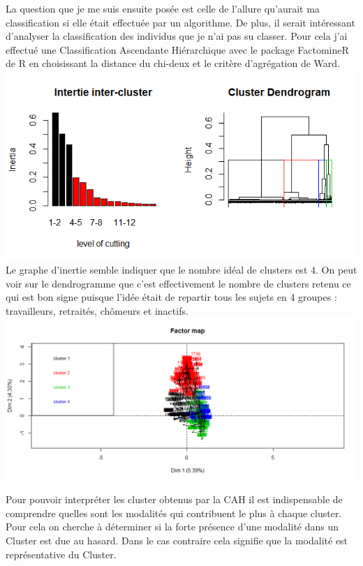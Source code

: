 \documentclass{book}
\begin{document}
\noindent
La question que je me suis ensuite posée est celle de l'allure qu'aurait ma classification si elle était effectuée par un algorithme. De plus, il serait intéressant d'analyser la classification des individus que je n'ai pas su classer.
Pour cela j'ai effectué une Classification Ascendante Hiérarchique avec le package FactomineR de R en choisissant la distance du chi-deux et le critère d'agrégation de Ward.\\

\includegraphics[scale = 1]{dendro_inertie_cah.png}\\
Le graphe d'inertie semble indiquer que le nombre idéal de clusters est 4. On peut voir sur le dendrogramme que c'est effectivement le nombre de clusters retenu ce qui est bon signe puisque l'idée était de repartir tous les sujets en 4 groupes : travailleurs, retraités, chômeurs et inactifs.
\includegraphics[scale = .5]{cah_ind_cluster.png}

Pour pouvoir interpréter les cluster obtenus par la CAH il est indispensable de comprendre quelles sont les modalités qui contribuent le plus à chaque cluster.\\
Pour cela on cherche à déterminer si la forte présence d'une modalité dans un Cluster est due au hasard. Dans le cas contraire cela signifie que la modalité est représentative du Cluster.\\\\
\end{document}
